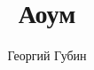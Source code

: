 \documentclass[draft]{extbook}
\title{Аоум}
\author{Георгий Губин}
\begin{document}
\newcommand{\soul}[1]{\bf{--- #1}\\*}
\newcommand{\people}[1]{\it{* #1}\\*}
\newcommand{\comment}[1]{#1\\}

\maketitle




%
%
%
%
%
%
%
%
\end{document}
